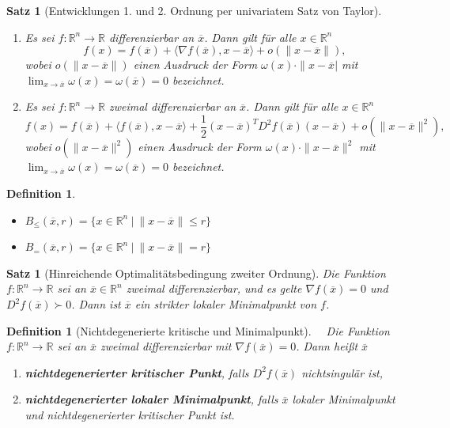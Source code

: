 \documentclass[11pt]{scrreprt}
\newcounter{thm}
\numberwithin{thm}{section}
\newtheorem{definition}[thm]{Definition}
\newtheorem{satz}[thm]{Satz}
\newtheorem*{definition*}{Definition}
\begin{document}
\setcounter{thm}{29}

\begin{satz}[Entwicklungen 1. und 2. Ordnung per univariatem Satz von Taylor] ~\
	\begin{enumerate}[label=\alph*\upshape)]
		\item Es sei $f \colon \mathbb{R}^n \rightarrow \mathbb{R}$ differenzierbar an $\overline{x}$. Dann gilt für alle $x \in \mathbb{R}^n$
			$$ f(x) = f(\overline{x}) + \langle \nabla f(\overline{x}), x -\overline{x} \rangle + o(\|x - \overline{x}\|), $$
			wobei $o(\|x-\overline{x}\|)$ einen Ausdruck der Form $\omega(x) \cdot \|x-\overline{x}|$ mit $\lim_{x \rightarrow \overline{x}} \omega(x) = \omega(\overline{x}) = 0$ bezeichnet.
		\item Es sei $f \colon \mathbb{R}^n \rightarrow \mathbb{R}$ zweimal differenzierbar an $\overline{x}$. Dann gilt für alle $x \in \mathbb{R}^n$
			$$ f(x) = f(\overline{x}) + \langle f(\overline{x}), x - \overline{x} \rangle + \frac{1}{2} (x-\overline{x})^T D^2 f(\overline{x}) (x-\overline{x}) + o(\|x-\overline{x}\|^2), $$
			wobei $o(\|x-\overline{x}\|^2)$ einen Ausdruck der Form $\omega(x) \cdot \|x-\overline{x}\|^2$ mit $\lim_{x \rightarrow \overline{x}} \omega(x) = \omega(\overline{x}) = 0$ bezeichnet.
	\end{enumerate}
\end{satz}

\begin{definition*} ~\
	\begin{itemize}
		\item $B_{\leq}(\overline{x}, r) = \big\{ x \in \mathbb{R}^n ~|~ \| x - \overline{x} \| \leq r \big\}$
		\item $B_{=}(\overline{x}, r) = \big\{ x \in \mathbb{R}^n ~|~ \| x - \overline{x} \| = r \big\}$
	\end{itemize}	
\end{definition*}

\begin{satz}[Hinreichende Optimalitätsbedingung zweiter Ordnung]
	Die Funktion $f \colon \mathbb{R}^n \rightarrow \mathbb{R}$ sei an $\overline{x} \in \mathbb{R}^n$ zweimal differenzierbar, und es gelte $\nabla f(\overline{x}) = 0$ und $D^2 f(\overline{x}) \succ 0$. Dann ist $\overline{x}$ ein strikter lokaler Minimalpunkt von $f$.
\end{satz}

\setcounter{thm}{34}

\begin{definition}[Nichtdegenerierte kritische und Minimalpunkt] ~\
	Die Funktion $f \colon \mathbb{R}^n \rightarrow \mathbb{R}$ sei an $\overline{x}$ zweimal differenzierbar mit $\nabla f(\overline{x}) = 0$. Dann heißt $\overline{x}$
	\begin{enumerate}[label=\alph*\upshape)]
		\item \textbf{nichtdegenerierter kritischer Punkt}, falls $D^2 f(\overline{x})$ nichtsingulär ist,
		\item \textbf{nichtdegenerierter lokaler Minimalpunkt}, falls $\overline{x}$ lokaler Minimalpunkt und nichtdegenerierter kritischer Punkt ist.
	\end{enumerate}	
\end{definition}
\end{document}
